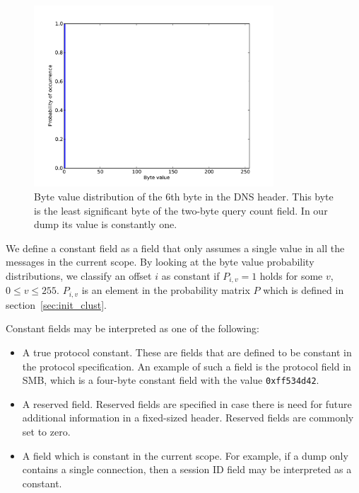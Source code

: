 \documentclass[a4paper]{report}
\begin{document}
\begin{figure}[h]
    \centering
    \includegraphics[width=0.8\textwidth]{img/const_one}
    \captionsetup{width=0.8\textwidth}
    \caption{Byte value distribution of the 6th byte in the DNS header. This
        byte is the least significant byte of the two-byte query count field.
        In our dump its value is constantly one.}
    \label{fig:const_one}
\end{figure}

We define a constant field as a field that only assumes a single value in all
the messages in the current scope. By looking at the byte value probability
distributions, we classify an offset $i$ as constant if $P_{i,v} = 1$ holds for
some $v$, $0 \le v \le 255$. $P_{i,v}$ is an element in the probability
matrix $P$ which is defined in section~\ref{sec:init_clust}.

Constant fields may be interpreted as one of the following:
\begin{itemize}
    \item A true protocol constant. These are fields that are defined to be
        constant in the protocol specification. An example of such a field is
        the protocol field in SMB, which is a four-byte constant field with
        the value \verb+0xff534d42+.
    \item A reserved field. Reserved fields are specified in case there is need
        for future additional information in a fixed-sized header. Reserved
        fields are commonly set to zero.
    \item A field which is constant in the current scope. For example, if a dump
        only contains a single connection, then a session ID field may be
        interpreted as a constant. 
\end{itemize}
\end{document}
